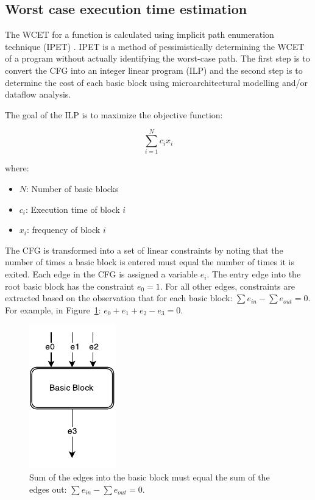 \documentclass[table,11pt]{article}
\begin{document}
\subsection{Worst case execution time estimation}
The WCET for a function is calculated using implicit path enumeration technique (IPET) \cite{Li:1995:PAE:216636.216666}. IPET is a method of pessimistically determining the WCET of a
program without actually identifying the worst-case path. The first step is to convert the CFG into an integer linear program (ILP) and the second step is to determine the cost of each basic block using microarchitectural modelling and/or dataflow analysis. 

The goal of the ILP is to maximize the objective function:

\begin{equation}
\sum_{i=1}^{N}c_ix_i
\end{equation}

where:

\begin{itemize}
  \item $N$: Number of basic blocks
  \item $c_i$: Execution time of block $i$
  \item $x_i$: frequency of block $i$
\end{itemize}

The CFG is transformed into a set of linear constraints by noting that the number of times a basic block is entered must equal the number of times it is exited. Each edge in the CFG is assigned a variable $e_i$. The entry edge into the root basic block has the constraint $e_0 = 1$. For all other edges, constraints are extracted based on the observation that for each basic block: $\sum e_{in} - \sum e_{out} = 0$. For example, in Figure~\ref{f:bbedges}: $e_0+e_1+e_2-e_3=0$.

\begin{figure}[h]
\centering
\includegraphics[scale=1]{figures/bbedges.pdf}
\caption{Sum of the edges into the basic block must equal the sum of the edges out: $\sum e_{in} - \sum e_{out} = 0$.} 
\label{f:bbedges}
\end{figure}
\end{document}
